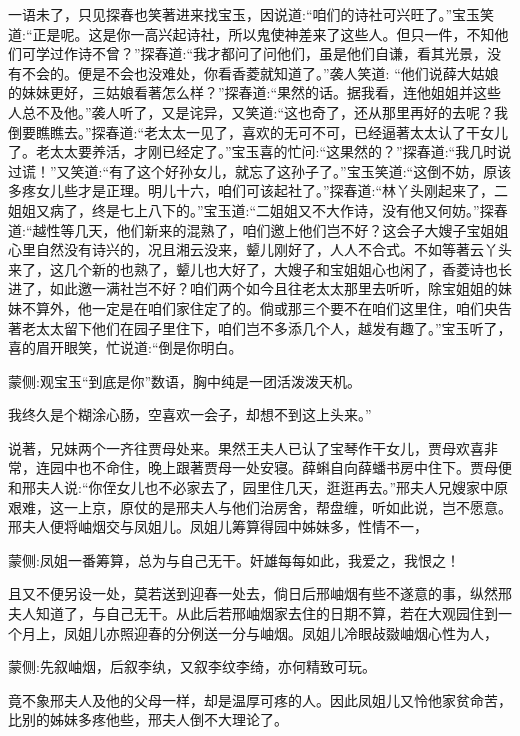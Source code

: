 \begin{parag}
    一语未了，只见探春也笑著进来找宝玉，因说道:“咱们的诗社可兴旺了。”宝玉笑道:“正是呢。这是你一高兴起诗社，所以鬼使神差来了这些人。但只一件，不知他们可学过作诗不曾？”探春道:“我才都问了问他们，虽是他们自谦，看其光景，没有不会的。便是不会也没难处，你看香菱就知道了。”袭人笑道: “他们说薛大姑娘的妹妹更好，三姑娘看著怎么样？”探春道:“果然的话。据我看，连他姐姐并这些人总不及他。”袭人听了，又是诧异，又笑道:“这也奇了，还从那里再好的去呢？我倒要瞧瞧去。”探春道:“老太太一见了，喜欢的无可不可，已经逼著太太认了干女儿了。老太太要养活，才刚已经定了。”宝玉喜的忙问:“这果然的？”探春道:“我几时说过谎！”又笑道:“有了这个好孙女儿，就忘了这孙子了。”宝玉笑道:“这倒不妨，原该多疼女儿些才是正理。明儿十六，咱们可该起社了。”探春道:“林丫头刚起来了，二姐姐又病了，终是七上八下的。”宝玉道:“二姐姐又不大作诗，没有他又何妨。”探春道:“越性等几天，他们新来的混熟了，咱们邀上他们岂不好？这会子大嫂子宝姐姐心里自然没有诗兴的，况且湘云没来，颦儿刚好了，人人不合式。不如等著云丫头来了，这几个新的也熟了，颦儿也大好了，大嫂子和宝姐姐心也闲了，香菱诗也长进了，如此邀一满社岂不好？咱们两个如今且往老太太那里去听听，除宝姐姐的妹妹不算外，他一定是在咱们家住定了的。倘或那三个要不在咱们这里住，咱们央告著老太太留下他们在园子里住下，咱们岂不多添几个人，越发有趣了。”宝玉听了，喜的眉开眼笑，忙说道:“倒是你明白。\begin{note}蒙侧:观宝玉“到底是你”数语，胸中纯是一团活泼泼天机。\end{note}我终久是个糊涂心肠，空喜欢一会子，却想不到这上头来。”
\end{parag}


\begin{parag}
    说著，兄妹两个一齐往贾母处来。果然王夫人已认了宝琴作干女儿，贾母欢喜非常，连园中也不命住，晚上跟著贾母一处安寝。薛蝌自向薛蟠书房中住下。贾母便和邢夫人说:“你侄女儿也不必家去了，园里住几天，逛逛再去。”邢夫人兄嫂家中原艰难，这一上京，原仗的是邢夫人与他们治房舍，帮盘缠，听如此说，岂不愿意。邢夫人便将岫烟交与凤姐儿。凤姐儿筹算得园中姊妹多，性情不一，\begin{note}蒙侧:凤姐一番筹算，总为与自己无干。奸雄每每如此，我爱之，我恨之！\end{note}且又不便另设一处，莫若送到迎春一处去，倘日后邢岫烟有些不遂意的事，纵然邢夫人知道了，与自己无干。从此后若邢岫烟家去住的日期不算，若在大观园住到一个月上，凤姐儿亦照迎春的分例送一分与岫烟。凤姐儿冷眼敁敠岫烟心性为人，\begin{note}蒙侧:先叙岫烟，后叙李纨，又叙李纹李绮，亦何精致可玩。\end{note}竟不象邢夫人及他的父母一样，却是温厚可疼的人。因此凤姐儿又怜他家贫命苦，比别的姊妹多疼他些，邢夫人倒不大理论了。
\end{parag}


